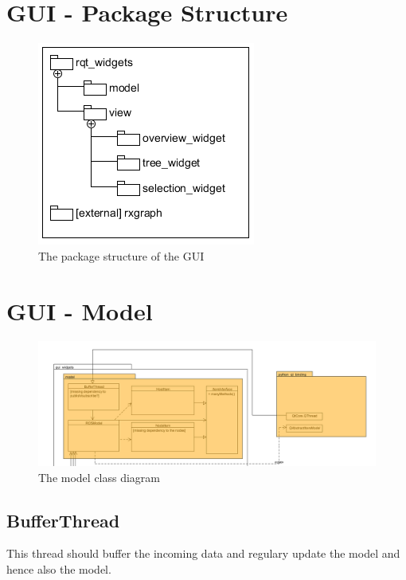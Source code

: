 \section{GUI - Package Structure}
\begin{figure}[!ht]
\begin{center}
\includegraphics[scale=1.0]{./bilder/package_structure_gui.png}
\caption{The package structure of the GUI}
\label{The package structure of the GUI}
\end{center}
\end{figure}

\mbox{}

\newpage


\section{GUI - Model}
\begin{figure}[!ht]
\begin{center}
\includegraphics[width=1.0\linewidth]{./bilder/model.png}
\caption{The model class diagram}
\end{center}
\end{figure}

\subsection{BufferThread}
This thread should buffer the incoming data and regulary update the model and
hence also the model.
